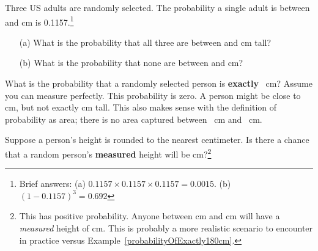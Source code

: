 \begin{exercise}
Three US adults are randomly selected. The probability a single adult is between  and  cm is 0.1157.\footnote{Brief answers: (a) $0.1157 \times 0.1157 \times 0.1157 = 0.0015$. (b) $(1-0.1157)^3 = 0.692$} \vspace{-1.5mm}
\begin{enumerate}
\setlength{\itemsep}{0mm}
\item[(a)] What is the probability that all three are between  and  cm tall?
\item[(b)] What is the probability that none are between  and  cm?
\end{enumerate}
\end{exercise}

\begin{example}{What is the probability that a randomly selected person is \textbf{exactly} ~cm? Assume you can measure perfectly.}
\label{probabilityOfExactly180cm}
This probability is zero. A person might be close to  cm, but not exactly  cm tall. This also makes sense with the definition of probability as area; there is no area captured between ~cm and ~cm.
\end{example}

\begin{exercise}
Suppose a person's height is rounded to the nearest centimeter. Is there a chance that a random person's \textbf{measured} height will be  cm?\footnote{This has positive probability. Anyone between  cm and  cm will have a \emph{measured} height of  cm. This is probably a more realistic scenario to encounter in practice versus Example~\ref{probabilityOfExactly180cm}.}
\end{exercise}





